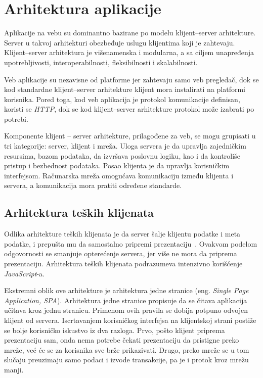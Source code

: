 \section{Arhitektura aplikacije}\label{ch:arhitektura}

Aplikacije na vebu su dominantno bazirane po modelu klijent--server arhitekture. 
Server u takvoj arhitekturi obezbeđuje uslugu klijentima koji je zahtevaju. Klijent--server 
arhitektura je višenamenska i modularna, a sa ciljem unapređenja upotrebljivosti, interoperabilnosti, 
fleksibilnosti i skalabilnosti. 

Veb aplikacije su nezavisne od platforme jer zahtevaju samo veb pregledač, dok se kod standardne 
klijent--server arhitekture klijent mora instalirati na platformi korisnika. Pored toga, 
kod veb aplikacija je protokol komunikacije definisan, koristi se \textit{HTTP}, dok se kod klijent--server
arhitekture protokol može izabrati po potrebi.

Komponente klijent -- server arhitekture, prilagođene za veb, se mogu grupisati u tri kategorije: 
server, klijent i mreža. Uloga servera je da upravlja zajedničkim resursima, bazom podataka, da 
izvršava poslovnu logiku, kao i da kontroliše pristup i bezbednost podataka. Posao klijenta je da 
upravlja korisničkim interfejsom. Računarska mreža omogućava komunikaciju između klijenta i servera, 
a komunikacija mora pratiti određene standarde.

\subsection{Arhitektura teških klijenata}\label{sec:arhitektura-spa}

Odlika arhitekture teških klijenata je da server šalje klijentu podatke i meta podatke, i prepušta 
mu da samostalno pripremi prezentaciju~\cite{PVEB}. Ovakvom podelom odgovornosti se smanjuje opterećenje 
servera, jer više ne mora da priprema prezentaciju. Arhitektura teških klijenata podrazumeva intenzivno 
korišćenje \textit{JavaScript}-a.

Ekstremni oblik ove arhitekture je arhitektura jedne stranice (eng. \textit{Single Page Application, SPA}).
Arhitektura jedne stranice propisuje da se čitava aplikacija učitava kroz jednu stranicu. Primenom 
ovih pravila se dobija potpuno odvojen klijent od servera. Iscrtavanjem korisničkog 
interfejsa na klijentskoj strani postiže se bolje korisničko iskustvo iz dva razloga. Prvo, pošto klijent 
priprema prezentaciju sam, onda nema potrebe čekati prezentaciju da pristigne preko mreže, već će se za korisnika
sve brže prikazivati. Drugo, preko mreže se u tom slučaju preuzimaju samo podaci i izvode transakcije, 
pa je i protok kroz mrežu manji.

